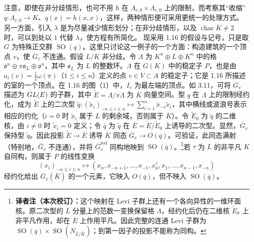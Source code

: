 注意，即使在非分歧情形，也可不用 $h$ 在 $\Lambda_{r,0}\times\Lambda_{r,0}$ 上的限制，而考察其“收缩”$q:\Lambda_{r,0}\to K$、$q(x)=h(x,x)$，这样，两种情形便可采用更统一的处理方式。另一方面，引入 $\lambda$ 是为尽量减少情形划分；在非分歧情形，以及 $\operatorname{char}\overline K\ne2$ 时，可以到处以 $1$ 代替 $\lambda$，使方程有所简化。
现采用 1.16 的假设与记号，只是取 $G$ 为特殊正交群 $\operatorname{SO}(q)$。这里只讨论这一例子的一个方面：构造建筑的一个顶点 $v$，使 $\overline G_v$ 不连通。假设 $L/K$ 非分歧。令 $\Lambda$ 为 $K^n\oplus L\oplus K^n$ 中的格 $\mathfrak o^n\oplus\pi\mathfrak o_L\oplus\mathfrak o^n$，其中 $\mathfrak o_L$ 为 $L$ 的整数环。$\Lambda$ 在 $G(K)$ 中的稳定子 $P$，也是由 $a_i(v)=\frac12\omega(\pi)$（$1\leq i\leq n$）定义的点 $v\in V\subset A$ 的稳定子；它是 1.16 所描述的室的一个顶点。在 1.16 的图（1）中，$I_v$ 为最左端的顶点。如 3.11，可将 $\overline G_v$ 描述为 $GL(E)$ 的子群，其中 $\widetilde E=\Lambda/\pi\Lambda$ 为 $\overline K$ 向量空间。型 $q$ 在 $\Lambda$ 上的限制经约化，成为 $\widetilde E$ 上的二次型 $\widetilde q:(\widetilde x_i)_{-n\leq i\leq n}\mapsto\sum_{i=1}^n\widetilde x_{-i}\widetilde x_i$，其中横线或波浪号表示相应的约化（$i=0$ 时 $\widetilde x_i$ 属于 $L$ 的剩余域，否则属于 $\overline K$）。令 $\widetilde E_0$ 为 $\widetilde q$ 的二维核，由 $i\ne0$ 时 $\widetilde x_i=0$ 定义；令 $\overline q$ 为 $\widetilde q$ 在 $\overline E=\widetilde E/\widetilde E_0$ 上诱导的二次型。显然，$\overline G_v$ 保持型 $\widetilde q$。因此投影 $\widetilde E\to\overline E$ 诱导 $\overline K$ 同态 $\overline G_v\to O(\overline q)$。可验证，此同态满射（特别地，$\overline G_v$ 不连通），并将 $\overline G_v^{\mathrm{red}}$ 同构地映到 $\operatorname{SO}(\overline q)$。\footnote{\textbf{译者注（本次校订）：}这个映射在 Levi 子群上还有一个各向异性的一维环面核。原二次型的 $L$ 分量上的范数一变换保留格 $\Lambda$，经约化后仍在二维核 $\widetilde E_0$ 上非平凡作用，却在 $\overline E$ 上作用平凡。因此完整的连通 Levi 子群为 $\operatorname{SO}(\overline q)\times\operatorname{SO}(N_{\overline L/\overline K})$；到第一因子的投影不能称为同构。}若 $\tau$ 为 $L$ 的非平凡 $K$ 自同构，则属于 $P$ 的线性变换
\[
(x_i)_{-n\leq i\leq n}\longmapsto(x_n,x_{-n+1},\ldots,x_{-1},x_0^\tau,x_1,\ldots,x_{n-1},x_{-n})
\]
经约化给出 $\overline G_v(\overline K)$ 的一个元素，它映入 $O(\overline q)$，但不映入 $\operatorname{SO}(\overline q)$。
